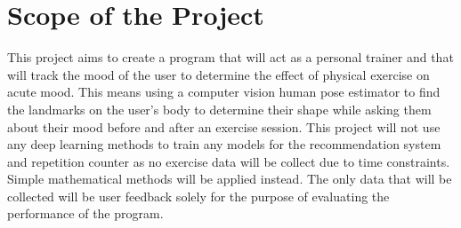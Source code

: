     
\section{Scope of the Project} 
    This project aims to create a program that will act as a personal trainer and that will track the mood of the user to determine the effect of physical exercise on acute mood. This means using a computer vision human pose estimator to find the landmarks on the user's body to determine their shape while asking them about their mood before and after an exercise session. This project will not use any deep learning methods to train any models for the recommendation system and repetition counter as no exercise data will be collect due to time constraints. Simple mathematical methods will be applied instead. The only data that will be collected will be user feedback solely for the purpose of evaluating the performance of the program.
    
